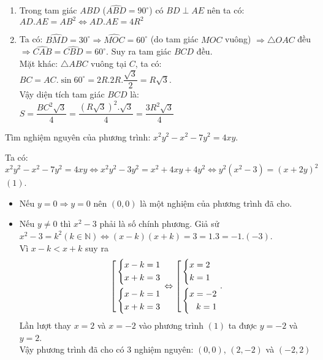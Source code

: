 \begin{ex}
{\begin{enumerate}
        \item Trong tam giác $ABD$ ($\widehat{ABD}=90^\circ$) có $BD\perp AE$ nên ta có: \\
        $AD.AE=AB^2\Leftrightarrow AD.AE=4R^2$
        \item Ta có: $\widehat{BMD}=30^\circ\Rightarrow \widehat{MOC}=60^\circ$ (do tam giác $MOC$ vuông) $\Rightarrow \triangle OAC$ đều $\Rightarrow \widehat{CAB}=\widehat{CBD}=60^\circ$. Suy ra tam giác $BCD$ đều.\\
        Mặt khác: $\triangle ABC$ vuông tại $C$, ta có: \\
        $BC=AC.\sin 60^\circ=2R.2R.\dfrac{\sqrt{3}}{2}=R\sqrt{3}$.\\
        Vậy diện tích tam giác $BCD$ là: \\
        $S=\dfrac{BC^2\sqrt{3}}{4}=\dfrac{(R\sqrt{3})^2.\sqrt{3}}{4}=\dfrac{3R^2\sqrt{3}}{4}$
    \end{enumerate}
    }
\end{ex}

\begin{ex}%
    Tìm nghiệm nguyên của phương trình: $x^2y^2-x^2-7y^2=4xy$.
\loigiai
    {Ta có: 
   $x^2y^2-x^2-7y^2=4xy\Leftrightarrow x^2y^2-3y^2=x^2+4xy+4y^2\Leftrightarrow y^2(x^2-3)=(x+2y)^2$ $(1)$.
   \begin{itemize}
   	\item Nếu $y=0\Rightarrow y=0$ nên $(0,0)$ là một nghiệm của phương trình đã cho.
   	\item Nếu $y\neq 0$ thì $x^2-3$ phải là số chính phương. Giả sử $x^2-3=k^2(k\in \mathbb{N})\Leftrightarrow (x-k)(x+k)=3=1.3=-1.(-3)$.\\
   	Vì $x-k<x+k$ suy ra
  $$\left[\begin{aligned}&\left\{\begin{aligned}x-k=1\\x+k=3\end{aligned}\right.\\ &\left\{\begin{aligned}x-k=1\\x+k=3\end{aligned}\right.\end{aligned}\right.\Leftrightarrow \left[\begin{aligned}&\left\{\begin{aligned}x=2\\k=1\end{aligned}\right.\\ &\left\{\begin{aligned}x=-2\\k=1\end{aligned}\right.\end{aligned}\right..$$
  Lần lượt thay $x=2$ và $x=-2$ vào phương trình $(1)$ ta được $y=-2$ và $y=2$.\\
  Vậy phương trình đã cho có 3 nghiệm nguyên: $(0,0)$, $(2,-2)$ và $(-2,2)$
   \end{itemize}
    }
\end{ex}

